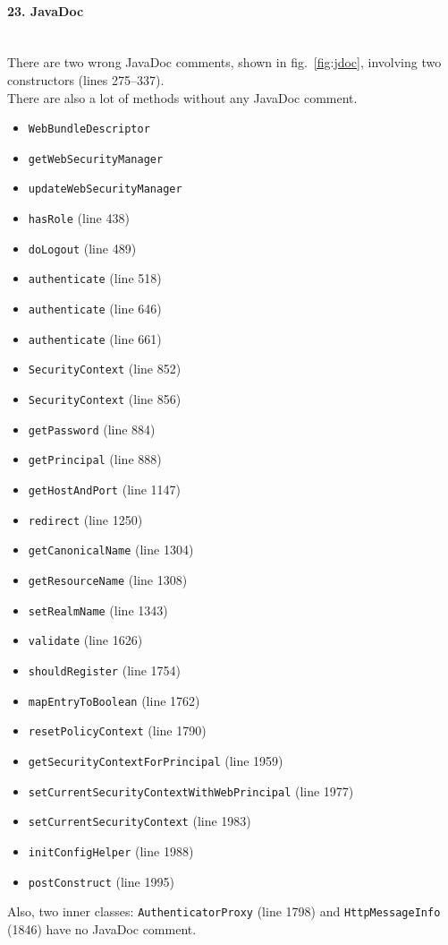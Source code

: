 \documentclass[english]{article}
\newcommand{\code}[1]{\texttt{#1}}
\newcommand{\issue}[3][?]{
    \paragraph{#1. #2} \mbox{}\\ #3
}
\begin{document}
\issue[23]{JavaDoc} {
    There are two wrong JavaDoc comments, shown in fig.~\ref{fig:jdoc}, 
    involving two constructors (lines 275--337). \\
    There are also a lot of methods without any JavaDoc comment.
    \begin{itemize}
    \item \code{WebBundleDescriptor}
    \item \code{getWebSecurityManager}
    \item \code{updateWebSecurityManager}
    \item \code{hasRole} (line 438)
    \item \code{doLogout} (line 489) 
    \item \code{authenticate} (line 518)
    \item \code{authenticate} (line 646)
    \item \code{authenticate} (line 661)
    \item \code{SecurityContext} (line 852)
    \item \code{SecurityContext} (line 856)
    \item \code{getPassword} (line 884) 
    \item \code{getPrincipal} (line 888)
    \item \code{getHostAndPort} (line 1147) 
    \item \code{redirect} (line 1250)
    \item \code{getCanonicalName} (line 1304) 
    \item \code{getResourceName} (line 1308)
    \item \code{setRealmName} (line 1343) 
    \item \code{validate} (line 1626)
    \item \code{shouldRegister} (line 1754) 
    \item \code{mapEntryToBoolean} (line 1762)
    \item \code{resetPolicyContext} (line 1790) 
    \item \code{getSecurityContextForPrincipal} (line 1959)
    \item \code{setCurrentSecurityContextWithWebPrincipal} (line 1977)
    \item \code{setCurrentSecurityContext} (line 1983)
    \item \code{initConfigHelper} (line 1988)
    \item \code{postConstruct} (line 1995)
    \end{itemize}
    
    Also, two inner classes: 
    \code{AuthenticatorProxy} (line 1798) and 
    \code{HttpMessageInfo} (1846) have no JavaDoc comment.
}
\end{document}
